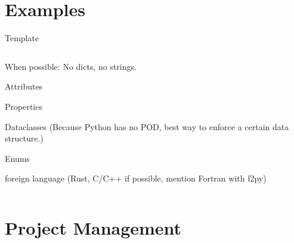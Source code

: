 \documentclass[9pt]{beamer}
\begin{document}
\section{Examples}

\begin{frame}{Template}
    \begin{columns}
        \begin{column}{0.5\textwidth}
            When possible: No dicts, no strings.

            Attributes

            Properties

            Dataclasses
            (Because Python has no POD, best way to enforce a certain
            data structure.)

            Enums

            foreign language (Rust, C/C++ if possible, mention Fortran with
            f2py)
        \end{column}
        \begin{column}{0.5\textwidth}
        \end{column}
    \end{columns}
\end{frame}

\section{Project Management}
\end{document}
